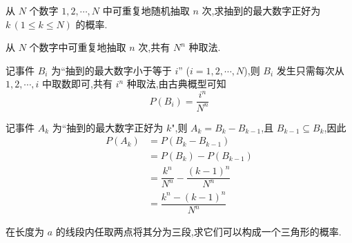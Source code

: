 \question 从 $N$ 个数字 $1,2,\cdots,N$ 中可重复地随机抽取 $n$ 次,求抽到的最大数字正好为 $k \, (1 \leqslant k \leqslant N)$ 的概率.

\begin{solution}
    从 $N$ 个数字中可重复地抽取 $n$ 次,共有 $N^n$ 种取法.

    记事件 $B_i$ 为``抽到的最大数字小于等于 $i$'' ($i=1,2,\cdots,N$),则 $B_i$ 发生只需每次从 $1,2,\cdots,i$ 中取数即可,共有 $i^n$ 种取法,由古典概型可知
    $$
    P(B_i) = \dfrac{i^n}{N^n}
    $$

    记事件 $A_k$ 为``抽到的最大数字正好为 $k$",则 $A_k = B_k - B_{k-1}$,且 $B_{k-1} \subseteq B_k$,因此
    $$
    \begin{aligned}
        P(A_k) &= P(B_k - B_{k-1}) \\
        &= P(B_k) - P(B_{k-1}) \\
        &= \dfrac{k^n}{N^n} - \dfrac{(k-1)^n}{N^n} \\
        &= \dfrac{k^n - (k-1)^n}{N^n}
    \end{aligned}
    $$
\end{solution}

\question 在长度为 $a$ 的线段内任取两点将其分为三段,求它们可以构成一个三角形的概率.

